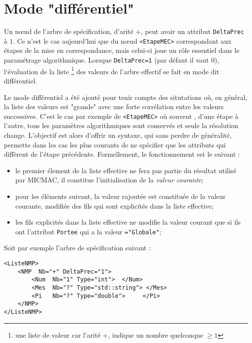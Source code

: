 \section{Mode "diff\'erentiel"}

\label{DUG:Mode:Dif}

Un n\oe{}ud de l'arbre de sp\'ecification, d'arit\'e $+$,
peut avoir un attribut {\tt DeltaPrec} \`a $1$. Ce n'est le cas aujourd'hui
que du n\oe{}ud {\tt <EtapeMEC>} correspondant aux \'etapes de la
mise en correspondance, mais celui-ci joue un 
r\^ole essentiel dans le param\'etrage algorithmique.
Lorsque {\tt DeltaPrec=1} (par d\'efaut il vaut $0$), l`\'evaluation
de la liste  \footnote{une liste de valeur car l'arit\'e $+$, 
indique un nombre quelconque $\geq 1$}
des valeurs de l'arbre effectif se fait en mode dit diff\'erentiel.

Le mode diff\'erentiel a \'et\'e ajout\'e  pour tenir compte des situtations
o\`u, en g\'en\'eral, la liste des valeurs est "grande"
avec une forte corr\'elation entre les
valeurs successives. C'est le cas par exemple de 
{\tt <EtapeMEC>} o\`u souvent , d'une \'etape \`a l'autre,
tous les param\`etres algorithmiques sont conserv\'es et 
seule la r\'esolution change. L'objectif est alors d'offrir
un syntaxe, qui sans perdre de g\'en\'eralit\'e, permette dans
les cas les plus courants de ne sp\'ecifier que les attributs qui
diff\`erent de l'\'etape pr\'ec\'edente. Formellement, le fonctionnement
est le suivant :

\begin{itemize}
   \item le premier \'element de la liste effective ne fera pas partie
         du r\'esultat utilis\'e par MICMAC, il constitue l'initialisation
         de la \emph{valeur courante};
    \item pour les \'el\'ements suivant, la valeur rajout\'ee
          est constitu\'ee de la valeur courante, modifi\'ee des 
          fils qui sont explicit\'es dans la liste effective;
     \item les fils explicit\'es dans la liste effective ne
            modifie la valeur courant que si ils ont l'attribut
           {\tt Portee} qui a la valeur {\tt ="Globale"};
\end{itemize}

Soit par exemple l'arbre de sp\'ecification suivant :

\begin{verbatim}
<ListeNMP>
    <NMP  Nb="+" DeltaPrec="1">
        <Num  Nb="1" Type="int">  </Num>
        <Mes  Nb="?" Type="std::string"> </Mes>
        <Pi   Nb="?" Type="double">     </Pi>
    </NMP>
</ListeNMP>
\end{verbatim}

